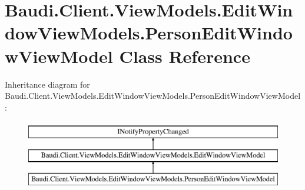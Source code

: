 \hypertarget{class_baudi_1_1_client_1_1_view_models_1_1_edit_window_view_models_1_1_person_edit_window_view_model}{}\section{Baudi.\+Client.\+View\+Models.\+Edit\+Window\+View\+Models.\+Person\+Edit\+Window\+View\+Model Class Reference}
\label{class_baudi_1_1_client_1_1_view_models_1_1_edit_window_view_models_1_1_person_edit_window_view_model}
Inheritance diagram for Baudi.\+Client.\+View\+Models.\+Edit\+Window\+View\+Models.\+Person\+Edit\+Window\+View\+Model\+:\begin{figure}[H]
\begin{center}
\leavevmode
\includegraphics[height=3.000000cm]{class_baudi_1_1_client_1_1_view_models_1_1_edit_window_view_models_1_1_person_edit_window_view_model}
\end{center}
\end{figure}
